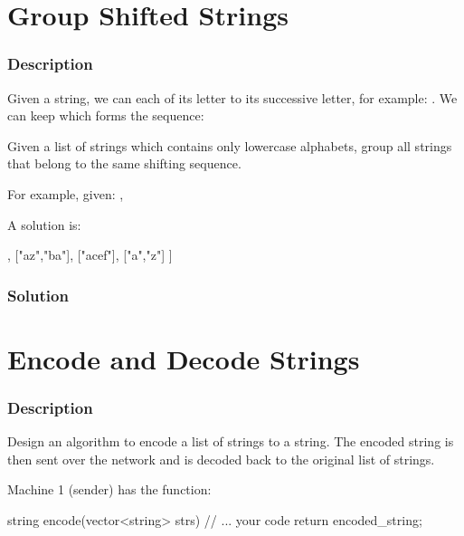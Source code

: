 \newpage

\section{Group Shifted Strings} %

\subsubsection{Description}
Given a string, we can  each of its letter to its successive letter, for example: . We can keep  which forms the sequence:


Given a list of strings which contains only lowercase alphabets, group all strings that belong to the same shifting sequence.

For example, given: ,

A solution is:
\begin{Code}
[
  ["abc","bcd","xyz"],
  ["az","ba"],
  ["acef"],
  ["a","z"]
]
\end{Code}

\subsubsection{Solution}

\begin{Code}

\end{Code}

\newpage

\section{Encode and Decode Strings} %

\subsubsection{Description}
Design an algorithm to encode a list of strings to a string. The encoded string is then sent over the network and is decoded back to the original list of strings.

Machine 1 (sender) has the function:

\begin{Code}
string encode(vector<string> strs) {
  // ... your code
  return encoded_string;
}
\end{Code}

